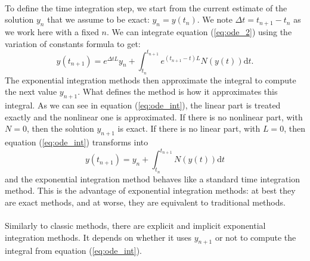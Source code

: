     \paragraph{}
    To define the time integration step, we start from the current estimate of the solution $y_n$ that we assume to be exact: $y_n = y\left(t_n\right)$.
    We note $\Delta t = t_{n+1} - t_n$ as we work here with a fixed $n$.
    We can integrate equation (\ref{eq:ode_2}) using the variation of constants formula to get:
    \begin{equation}\label{eq:ode_int}
      y\left(t_{n+1}\right) = e^{\Delta t L} y_n + \int_{t_n}^{t_{n+1}} e^{\left(t_{n+1} - t\right) L} N\left(y\left(t\right)\right) \mathrm{d}t .
    \end{equation}
    The exponential integration methods then approximate the integral to compute the next value $y_{n+1}$.
    What defines the method is how it approximates this integral.
    As we can see in equation (\ref{eq:ode_int}), the linear part is treated exactly and the nonlinear one is approximated.
    If there is no nonlinear part, with $N = 0$, then the solution $y_{n+1}$ is exact.
    If there is no linear part, with $L = 0$, then equation (\ref{eq:ode_int}) transforms into
    \begin{equation}\label{eq:ode_int_classic}
      y\left(t_{n+1}\right) = y_n + \int_{t_n}^{t_{n+1}} N\left(y\left(t\right)\right) \mathrm{d}t
    \end{equation}
    and the exponential integration method behaves like a standard time integration method.
    This is the advantage of exponential integration methods: at best they are exact methods, and at worse, they are equivalent to traditional methods.

    \paragraph{}
    Similarly to classic methods, there are explicit \cite{BhattKhaliqWade2018} and implicit \cite{NieZhangZhao2006} exponential integration methods.
    It depends on whether it uses $y_{n+1}$ or not to compute the integral from equation (\ref{eq:ode_int}).

